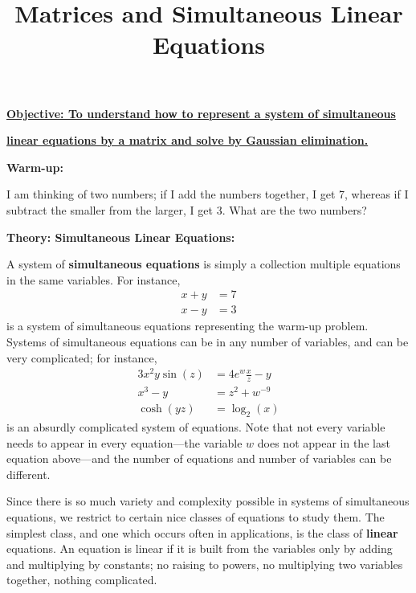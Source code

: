 \documentclass{article}
\begin{document}
\title{Matrices and Simultaneous Linear Equations}
\date{}

\maketitle
\thispagestyle{empty}

\Large

\textbf{\underline{Objective: To understand how to represent a system of simultaneous}}

\textbf{\underline{linear equations by a matrix and solve by Gaussian elimination.}}






\vspace{5mm}

\textbf{Warm-up:}\bigskip

I am thinking of two numbers; if I add the numbers together, I get 7, whereas if I subtract the smaller from the larger, I get 3. What are the two numbers?



\clearpage



\textbf{Theory: Simultaneous Linear Equations:}\bigskip


A system of \textbf{simultaneous equations} is simply a collection multiple equations in the same variables. For instance,
\begin{align*}
	x+y&=7\\
	x-y&=3
\end{align*}
is a system of simultaneous equations representing the warm-up problem. Systems of simultaneous equations can be in any number of variables, and can be very complicated; for instance,
\begin{align*}
	3x^2y\sin(z)&=4e^w\frac{x}{z}-y\\
	x^3-y&=z^2+w^{-9}\\
	\cosh(yz)&=\log_2(x)
\end{align*}
is an absurdly complicated system of equations. Note that not every variable needs to appear in every equation---the variable $w$ does not appear in the last equation above---and the number of equations and number of variables can be different.

Since there is so much variety and complexity possible in systems of simultaneous equations, we restrict to certain nice classes of equations to study them. The simplest class, and one which occurs often in applications, is the class of \textbf{linear} equations. An equation is linear if it is built from the variables only by adding and multiplying by constants; no raising to powers, no multiplying two variables together, nothing complicated.\bigskip
\end{document}
